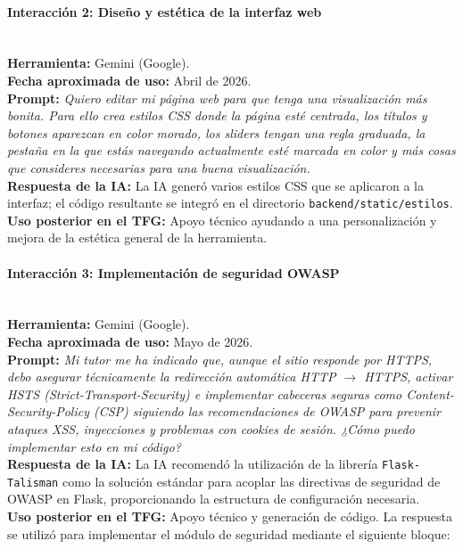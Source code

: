 \paragraph{Interacción 2: Diseño y estética de la interfaz web} \mbox{} \\
\textbf{Herramienta:} Gemini (Google). \\
\textbf{Fecha aproximada de uso:} Abril de 2026. \\
\textbf{Prompt:} \textit{ Quiero editar mi página web para que tenga una visualización más bonita. Para ello crea estilos CSS donde la página esté centrada, los títulos y botones aparezcan en color morado, los sliders tengan una regla graduada, la pestaña en la que estás navegando actualmente esté marcada en color y más cosas que consideres necesarias para una buena visualización.} \\
\textbf{Respuesta de la IA:} La IA generó varios estilos CSS que se aplicaron a la interfaz; el código resultante se integró en el directorio \texttt{backend/static/estilos}. \\
\textbf{Uso posterior en el TFG:} Apoyo técnico ayudando a una personalización y mejora de la estética general de la herramienta.

\paragraph{Interacción 3: Implementación de seguridad OWASP} \mbox{} \\
\textbf{Herramienta:} Gemini (Google). \\
\textbf{Fecha aproximada de uso:} Mayo de 2026. \\
\textbf{Prompt:} \textit{ Mi tutor me ha indicado que, aunque el sitio responde por HTTPS, debo asegurar técnicamente la redirección automática HTTP $\rightarrow$ HTTPS, activar HSTS (Strict-Transport-Security) e implementar cabeceras seguras como Content-Security-Policy (CSP) siguiendo las recomendaciones de OWASP para prevenir ataques XSS, inyecciones y problemas con cookies de sesión. ¿Cómo puedo implementar esto en mi código?} \\
\textbf{Respuesta de la IA:} La IA recomendó la utilización de la librería \texttt{Flask-Talisman} como la solución estándar para acoplar las directivas de seguridad de OWASP en Flask, proporcionando la estructura de configuración necesaria. \\
\textbf{Uso posterior en el TFG:} Apoyo técnico y generación de código. La respuesta se utilizó para implementar el módulo de seguridad mediante el siguiente bloque:

